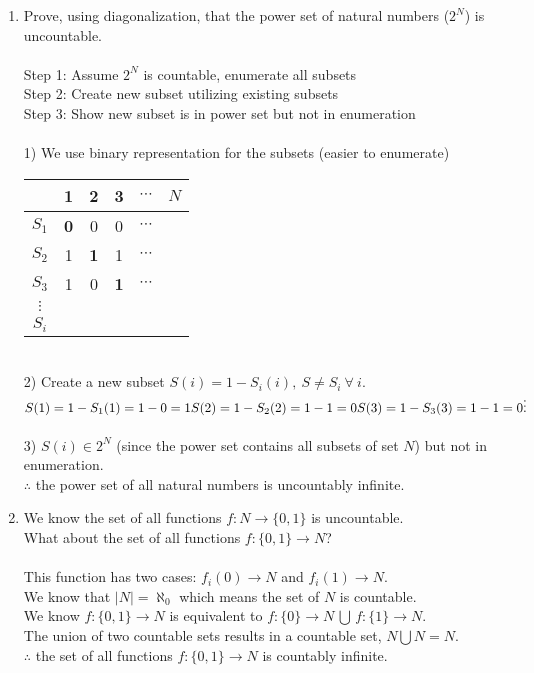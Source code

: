 \documentclass[10pt,a4paper,final]{article}
\begin{document}
\begin{enumerate}
\item %
Prove, using diagonalization, that the power set of natural numbers ($2^N$) is uncountable.\\
\\
Step 1: Assume $2^N$ is countable, enumerate all subsets\\
Step 2: Create new subset utilizing existing subsets\\
Step 3: Show new subset is in power set but not in enumeration\\
\\
1) We use binary representation for the subsets (easier to enumerate)
\begin{tabular}{c|c c c c c}
& 1 & 2 & 3 & $\cdots$ & $N$ \\
\hline
$S_1$ & \textbf{0} & 0 & 0 & $\cdots$\\
$S_2$ & 1 & \textbf{1} & 1 & $\cdots$\\
$S_3$ & 1 & 0 & \textbf{1} & $\cdots$\\
$\vdots$\\
$S_i$\\
\end{tabular}\\
2) Create a new subset $S(i) = 1-S_i(i), \: S \neq S_i \: \forall \: i$.\\
$S(1) = 1 - S_1(1) = 1 - 0 = 1\\
S(2) = 1 - S_2(2) = 1 - 1 = 0\\
S(3) = 1 - S_3(3) = 1 - 1 = 0\\
\vdots$\\
\\
3) $S(i) \in 2^N$ (since the power set contains all subsets of set $N$) but not in enumeration.\\
$\therefore$ the power set of all natural numbers is uncountably infinite.

\item %
We know the set of all functions $f:N \rightarrow \{0,1\}$ is uncountable.\\
What about the set of all functions $f:\{0,1\} \rightarrow N$?\\
\\
This function has two cases: $f_i(0) \rightarrow N$ and $f_i(1) \rightarrow N$.\\
We know that $|N| = \aleph_0$ which means the set of $N$ is countable.\\
We know $f:\{0,1\} \rightarrow N$ is equivalent to
$f:\{0\} \rightarrow N \, \bigcup \, f:\{1\} \rightarrow N$.\\
The union of two countable sets results in a countable set, $N \bigcup N = N$.\\
$\therefore$ the set of all functions $f:\{0,1\} \rightarrow N$ is countably infinite.


\end{enumerate}
\end{document}
